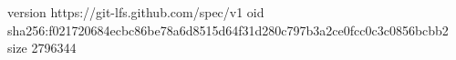 version https://git-lfs.github.com/spec/v1
oid sha256:f021720684ecbc86be78a6d8515d64f31d280c797b3a2ce0fcc0c3c0856bcbb2
size 2796344
